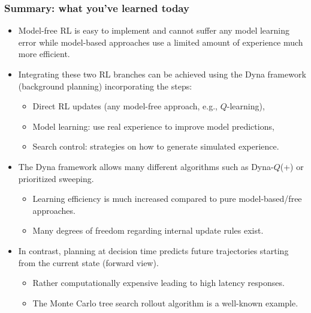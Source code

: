 \begin{frame}
\frametitle{Summary: what you've learned today}
\begin{itemize}
	\item Model-free RL is easy to implement and cannot suffer any model learning error while model-based approaches use a limited amount of experience much more efficient. \pause
	\item Integrating these two RL branches can be achieved using the Dyna framework (background planning) incorporating the steps:
	\begin{itemize}
		\item Direct RL updates (any model-free approach, e.g., $Q$-learning),
		\item Model learning: use real experience to improve model predictions,
		\item Search control: strategies on how to generate simulated experience. \pause
	\end{itemize}
	\item The Dyna framework allows many different algorithms such as Dyna-$Q$(+) or prioritized sweeping.
	\begin{itemize}
		\item Learning efficiency is much increased compared to pure model-based/free approaches.
		\item Many degrees of freedom regarding internal update rules exist.\pause 
	\end{itemize}
	\item In contrast, planning at decision time predicts future trajectories starting from the current state (forward view).
	\begin{itemize}
		\item Rather computationally expensive leading to high latency responses.
		\item The Monte Carlo tree search rollout algorithm is a well-known example.
	\end{itemize}
\end{itemize}
\end{frame}